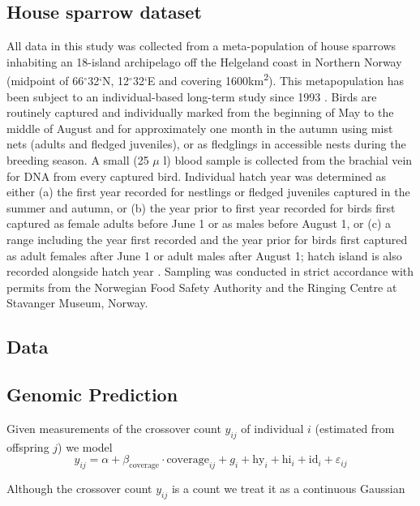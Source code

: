 \documentclass[dvipsnames]{article}
\begin{document}
\subsection*{House sparrow dataset}

All data in this study was collected from a meta-population of house sparrows inhabiting an 18-island archipelago off the Helgeland coast in Northern Norway (midpoint of 66$^\circ$32`N, 12$^\circ$32`E and covering 1600km\textsuperscript{2}). This metapopulation has been subject to an individual-based long-term study since 1993 \citep{Jensen2004-wt}. Birds are routinely captured and individually marked from the beginning of May to the middle of August and for approximately one month in the autumn using mist nets (adults and fledged juveniles), or as fledglings in accessible nests during the breeding season. A small (25 $\mu$ l) blood sample is collected from the brachial vein for DNA from every captured bird. Individual hatch year was determined as either (a) the first year recorded for nestlings or fledged juveniles captured in the summer and autumn, or (b) the year prior to first year recorded for birds first captured as female adults before June 1 or as males before August 1, or (c) a range including the year first recorded and the year prior for birds first captured as adult females after June 1 or adult males after August 1; hatch island is also recorded alongside hatch year \citep{ranke2021spatial, Saatoglu2021-ya}. Sampling was conducted in strict accordance with permits from the Norwegian Food Safety Authority and the Ringing Centre at Stavanger Museum, Norway.


\subsection*{Data}

\subsection*{Genomic Prediction}

Given measurements of the crossover count $y_{ij}$ of individual $i$ (estimated from offspring $j$) we model
\begin{equation*}
    y_{ij} = \alpha + \beta_\text{coverage} \cdot \text{coverage}_{ij} + g_i + \text{hy}_i + \text{hi}_i + \text{id}_i + \varepsilon_{ij}
\end{equation*}

Although the crossover count $y_{ij}$ is a count we treat it as a continuous Gaussian
\end{document}
